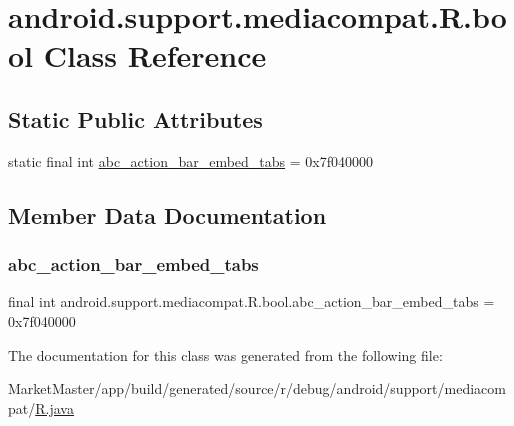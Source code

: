 \hypertarget{classandroid_1_1support_1_1mediacompat_1_1R_1_1bool}{}\section{android.\+support.\+mediacompat.\+R.\+bool Class Reference}
\label{classandroid_1_1support_1_1mediacompat_1_1R_1_1bool}
\subsection*{Static Public Attributes}
\begin{DoxyCompactItemize}
\item 
static final int \mbox{\hyperlink{classandroid_1_1support_1_1mediacompat_1_1R_1_1bool_abb24c449546205df61a1fd3372dcaae9}{abc\+\_\+action\+\_\+bar\+\_\+embed\+\_\+tabs}} = 0x7f040000
\end{DoxyCompactItemize}


\subsection{Member Data Documentation}
\mbox{\label{classandroid_1_1support_1_1mediacompat_1_1R_1_1bool_abb24c449546205df61a1fd3372dcaae9}} 
\subsubsection{\texorpdfstring{abc\+\_\+action\+\_\+bar\+\_\+embed\+\_\+tabs}{abc\_action\_bar\_embed\_tabs}}
{\footnotesize\ttfamily final int android.\+support.\+mediacompat.\+R.\+bool.\+abc\+\_\+action\+\_\+bar\+\_\+embed\+\_\+tabs = 0x7f040000\hspace{0.3cm}{\ttfamily [static]}}



The documentation for this class was generated from the following file\+:\begin{DoxyCompactItemize}
\item 
Market\+Master/app/build/generated/source/r/debug/android/support/mediacompat/\mbox{\hyperlink{debug_2android_2support_2mediacompat_2R_8java}{R.\+java}}\end{DoxyCompactItemize}
